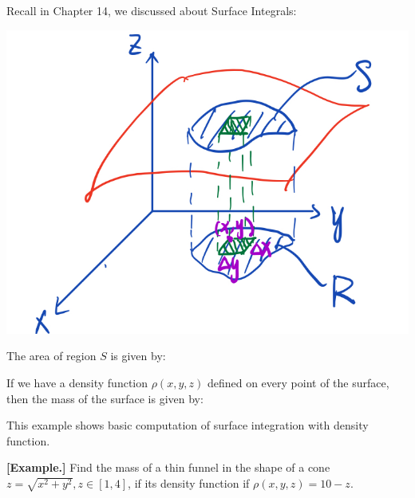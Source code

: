 \documentclass[11pt, a4paper]{MATH2023}
\newcommand{\eg}{\textbf{[Example.] }}
\begin{document}
\begin{spacing}{1.3}
    {\blue Recall in Chapter 14, we discussed about Surface Integrals:}
    \begin{center}
        \includegraphics[scale=0.24]{images/Ch14-surface-area.jpeg}
    \end{center}
    The area of region $S$ is given by:
    \begin{center}
    \end{center}
    If we have a density function $\rho (x,y,z)$ defined on every point of the surface,
    then the mass of the surface is given by:
    \begin{center}
    \end{center}

    

    \newpage
    {\blue This example shows basic computation of surface integration with density function.}
    
    \eg Find the mass of a thin funnel in the shape of a cone $z=\sqrt{x^2+y^2}, z\in [1,4]$,
    if its density function if $\rho(x,y,z)=10-z$.


\end{spacing}
\end{document}

